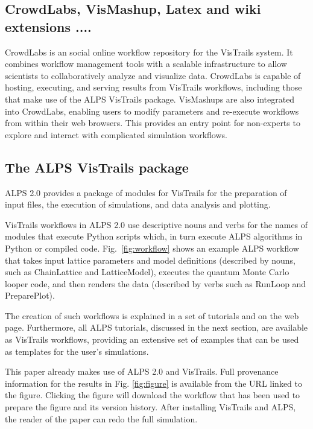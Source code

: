 \documentclass[12pt]{iopart}
\begin{document}
\subsection{CrowdLabs, VisMashup, Latex and wiki extensions ....}
CrowdLabs is an social online workflow repository for the VisTrails system. It combines workflow management tools with a scalable infrastructure to allow scientists to collaboratively analyze and visualize data. CrowdLabs is capable of hosting, executing, and serving results from VisTrails workflows, including those that make use of the ALPS VisTrails package. VisMashups \cite{Santos09} are also integrated into CrowdLabs, enabling users to modify parameters and re-execute workflows from within their web browsers. This provides an entry point for non-experts to explore and interact with complicated simulation workflows.

\subsection{The ALPS VisTrails package}

ALPS 2.0 provides a package of modules for VisTrails for the preparation of input files, the execution of simulations, and data analysis and plotting.

VisTrails workflows in ALPS 2.0 use descriptive nouns and verbs for the names of modules that execute
 Python scripts which, in turn execute ALPS
algorithms in Python or compiled code.  Fig.~\ref{fig:workflow} shows an example ALPS workflow
that takes input lattice parameters and model definitions (described by nouns, such as 
 ChainLattice and LatticeModel), executes the quantum
Monte Carlo looper code, and then renders the data (described by verbs such as  RunLoop and PreparePlot).

The creation of such workflows is explained in a set of tutorials and on the web page. Furthermore, all ALPS tutorials, discussed in the next section, are available  as VisTrails workflows, providing an extensive set of examples that can be used as templates for the user's simulations. 

This paper already makes use of ALPS 2.0 and VisTrails. Full provenance information for the results in Fig. \ref{fig:figure} is available from the URL linked to the figure. Clicking the figure will download the workflow that has been used to prepare the figure and its version history. After installing VisTrails and ALPS, the reader of the paper can redo the full simulation.
\end{document}
